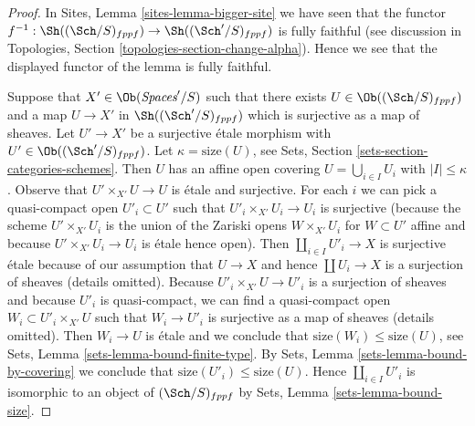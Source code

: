\begin{proof}
In Sites, Lemma \ref{sites-lemma-bigger-site} we have seen that the functor
$f^{-1} : \Sh((\Sch/S)_{fppf}) \to \Sh((\Sch'/S)_{fppf})$
is fully faithful (see discussion in
Topologies, Section \ref{topologies-section-change-alpha}).
Hence we see that the displayed functor of the lemma is fully faithful.

\medskip\noindent
Suppose that $X' \in \Ob(\textit{Spaces}'/S)$ such that there exists
$U \in \Ob((\Sch/S)_{fppf})$ and a map $U \to X'$ in
$\Sh((\Sch'/S)_{fppf})$ which is surjective as a map of sheaves.
Let $U' \to X'$ be a surjective \'etale morphism with
$U' \in \Ob((\Sch'/S)_{fppf})$. Let $\kappa = \text{size}(U)$, see
Sets, Section \ref{sets-section-categories-schemes}.
Then $U$ has an affine open covering $U = \bigcup_{i \in I} U_i$
with $|I| \leq \kappa$. Observe that $U' \times_{X'} U \to U$ is \'etale
and surjective. For each $i$ we can pick a quasi-compact
open $U'_i \subset U'$ such that $U'_i \times_{X'} U_i \to U_i$
is surjective (because the scheme $U' \times_{X'} U_i$ is the
union of the Zariski opens $W \times_{X'} U_i$ for $W \subset U'$
affine and because $U' \times_{X'} U_i \to U_i$ is \'etale hence open).
Then $\coprod_{i \in I} U'_i \to X$ is surjective \'etale
because of our assumption that $U \to X$ and hence $\coprod U_i \to X$
is a surjection of sheaves (details omitted).
Because $U'_i \times_{X'} U \to U'_i$ is a surjection of sheaves
and because $U'_i$ is quasi-compact,
we can find a quasi-compact open $W_i \subset U'_i \times_{X'} U$
such that $W_i \to U'_i$ is surjective as a map of sheaves
(details omitted). Then $W_i \to U$ is \'etale and we conclude
that $\text{size}(W_i) \leq \text{size}(U)$, see
Sets, Lemma \ref{sets-lemma-bound-finite-type}. By
Sets, Lemma \ref{sets-lemma-bound-by-covering} we conclude
that $\text{size}(U'_i) \leq \text{size}(U)$.
Hence $\coprod_{i \in I} U'_i$ is isomorphic to an object of
$(\Sch/S)_{fppf}$ by Sets, Lemma \ref{sets-lemma-bound-size}.


\end{proof}
